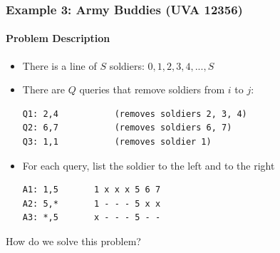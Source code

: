 \begin{frame}[fragile]
  \frametitle{Example 3: Army Buddies (UVA 12356)}
  \framesubtitle{Problem Description}

  \begin{block}{}
    \begin{itemize}
    \item There is a line of $S$ soldiers: $0,1,2,3,4,...,S$
    \item There are $Q$ queries that remove soldiers from $i$ to $j$:
\begin{verbatim}
Q1: 2,4           (removes soldiers 2, 3, 4)
Q2: 6,7           (removes soldiers 6, 7)
Q3: 1,1           (removes soldier 1)
\end{verbatim}
    \item For each query, list the soldier to the \alert{left} and to the \alert{right}
\begin{verbatim}
A1: 1,5       1 x x x 5 6 7
A2: 5,*       1 - - - 5 x x
A3: *,5       x - - - 5 - -
\end{verbatim}
    \end{itemize}
  \end{block}

  \bigskip

  How do we solve this problem?
\end{frame}

